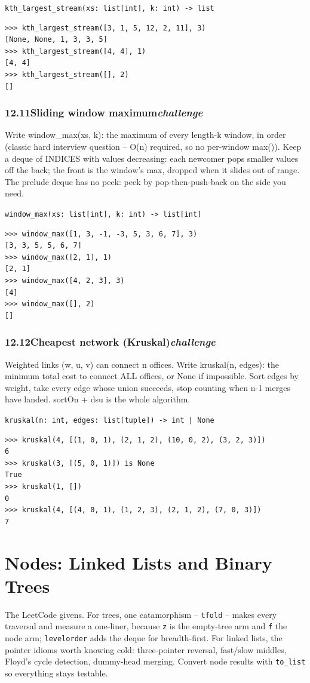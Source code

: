 \documentclass[10pt,letterpaper]{book}
\begin{document}
\noindent\texttt{kth\_largest\_stream(xs: list[int], k: int) -> list}
\begin{lstlisting}[style=ex]
>>> kth_largest_stream([3, 1, 5, 12, 2, 11], 3)
[None, None, 1, 3, 3, 5]
>>> kth_largest_stream([4, 4], 1)
[4, 4]
>>> kth_largest_stream([], 2)
[]
\end{lstlisting}
\subsection*{12.11\quad Sliding window maximum\hfill\textnormal{\textit{challenge}}}
Write window\_max(xs, k): the maximum of every length-k window, in order (classic hard interview question -- O(n) required, so no per-window max()). Keep a deque of INDICES with values decreasing: each newcomer pops smaller values off the back; the front is the window's max, dropped when it slides out of range. The prelude deque has no peek: peek by pop-then-push-back on the side you need.

\noindent\texttt{window\_max(xs: list[int], k: int) -> list[int]}
\begin{lstlisting}[style=ex]
>>> window_max([1, 3, -1, -3, 5, 3, 6, 7], 3)
[3, 3, 5, 5, 6, 7]
>>> window_max([2, 1], 1)
[2, 1]
>>> window_max([4, 2, 3], 3)
[4]
>>> window_max([], 2)
[]
\end{lstlisting}
\subsection*{12.12\quad Cheapest network (Kruskal)\hfill\textnormal{\textit{challenge}}}
Weighted links (w, u, v) can connect n offices. Write kruskal(n, edges): the minimum total cost to connect ALL offices, or None if impossible. Sort edges by weight, take every edge whose union succeeds, stop counting when n-1 merges have landed. sortOn + dsu is the whole algorithm.

\noindent\texttt{kruskal(n: int, edges: list[tuple]) -> int | None}
\begin{lstlisting}[style=ex]
>>> kruskal(4, [(1, 0, 1), (2, 1, 2), (10, 0, 2), (3, 2, 3)])
6
>>> kruskal(3, [(5, 0, 1)]) is None
True
>>> kruskal(1, [])
0
>>> kruskal(4, [(4, 0, 1), (1, 2, 3), (2, 1, 2), (7, 0, 3)])
7
\end{lstlisting}
\clearpage
\chapter{Nodes: Linked Lists and Binary Trees}

The LeetCode givens. For trees, one catamorphism -- \texttt{tfold} -- makes
every traversal and measure a one-liner, because \texttt{z} is the
empty-tree arm and \texttt{f} the node arm; \texttt{levelorder} adds the
deque for breadth-first. For linked lists, the pointer idioms worth knowing
cold: three-pointer reversal, fast/slow middles, Floyd's cycle detection,
dummy-head merging. Convert node results with \texttt{to\_list} so
everything stays testable.
\end{document}
